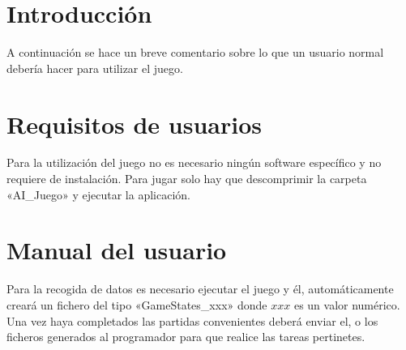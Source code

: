 
\section{Introducción}
A continuación se hace un breve comentario sobre lo que un usuario normal debería hacer para utilizar el juego.

\section{Requisitos de usuarios}
Para la utilización del juego no es necesario ningún software específico y no requiere de instalación. Para jugar solo hay que descomprimir la carpeta «AI\_Juego» y ejecutar la aplicación.


\section{Manual del usuario}
Para la recogida de datos es necesario ejecutar el juego y él, automáticamente creará un fichero del tipo «GameStates\_xxx» donde $xxx$ es un valor numérico. Una vez haya completados las partidas convenientes deberá enviar el, o los ficheros generados al programador para que realice las tareas pertinetes.



